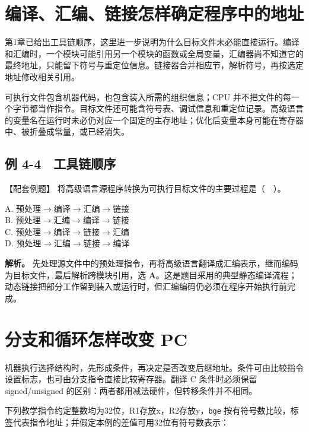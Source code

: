 \section{编译、汇编、链接怎样确定程序中的地址}\label{CO04-09}

第1章已给出工具链顺序，这里进一步说明为什么目标文件未必能直接运行。编译和汇编时，一个模块可能引用另一个模块的函数或全局变量，汇编器尚不知道它的最终地址，只能留下符号与重定位信息。链接器合并相应节，解析符号，再按选定地址修改相关引用。

可执行文件包含机器代码，也包含装入所需的组织信息；CPU 并不把文件的每一个字节都当作指令。目标文件还可能含符号表、调试信息和重定位记录。高级语言的变量名在运行时未必仍对应一个固定的主存地址；优化后变量本身可能在寄存器中、被折叠成常量，或已经消失。

\subsection{例 4-4　工具链顺序}\label{CO04-10}

\begin{example}[配套例题]

【配套例题】 将高级语言源程序转换为可执行目标文件的主要过程是（　）。

A. 预处理\ensuremath{\to}编译\ensuremath{\to}汇编\ensuremath{\to}链接\\
B. 预处理\ensuremath{\to}汇编\ensuremath{\to}编译\ensuremath{\to}链接\\
C. 预处理\ensuremath{\to}编译\ensuremath{\to}链接\ensuremath{\to}汇编\\
D. 预处理\ensuremath{\to}汇编\ensuremath{\to}链接\ensuremath{\to}编译

\end{example}

\textbf{解析。} 先处理源文件中的预处理指令，再将高级语言翻译成汇编表示，继而编码为目标文件，最后解析跨模块引用，选 \textbf{A}。这是题目采用的典型静态编译流程；动态链接把部分工作留到装入或运行时，但汇编编码仍必须在程序开始执行前完成。

\section{分支和循环怎样改变 PC}\label{CO04-11}

机器执行选择结构时，先形成条件，再决定是否改变后继地址。条件可由比较指令设置标志，也可由分支指令直接比较寄存器。翻译 C 条件时必须保留 signed/unsigned 的区别：两者都用减法硬件，但转移条件并不相同。

下列教学指令约定整数均为32位，R1存放x，R2存放y，\texttt{bge} 按有符号数比较，标签代表指令地址；并假定本例的差值可用32位有符号数表示：

